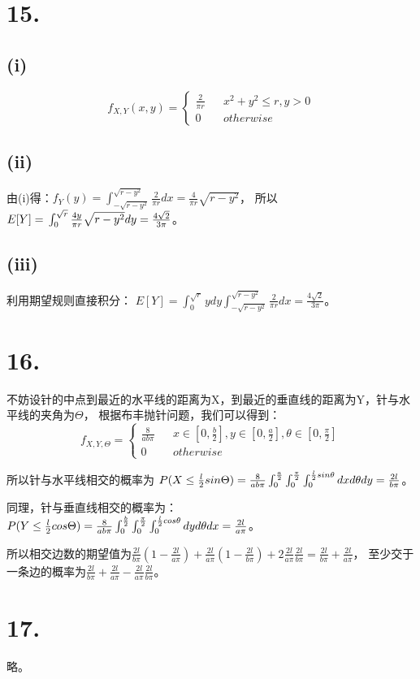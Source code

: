\documentclass[UTF8]{report}
\begin{document}
    \section*{15.}
        \subsection*{(i)}
            $$f_{X,Y}(x, y) = \left\{
                \begin{array}{lcr}
                    \frac{2}{\pi r} & & x^2 + y^2 \leq r, y > 0\\
                    0 & & otherwise
                \end{array}
            \right.$$
        \subsection*{(ii)}
            由(i)得：$f_Y(y) = \int_{-\sqrt{r - y^2}}^{\sqrt{r - y^2}}\frac{2}{\pi r}dx = \frac{4}{\pi r}\sqrt{r - y^2}$，
            所以$E[Y] =\\ \int_{0}^{\sqrt{r}}\frac{4y}{\pi r}\sqrt{r - y^2}dy = \frac{4\sqrt{2}}{3 \pi}$。
        \subsection*{(iii)}
            利用期望规则直接积分：
            $E[Y] = \int_{0}^{\sqrt{r}}ydy\int_{-\sqrt{r - y^2}}^{\sqrt{r - y^2}}\frac{2}{\pi r}dx = \frac{4\sqrt{2}}{3 \pi}$。
    \section*{16.}
        不妨设针的中点到最近的水平线的距离为X，到最近的垂直线的距离为Y，针与水平线的夹角为$\Theta$，
        根据布丰抛针问题，我们可以得到：
        $$f_{X, Y, \Theta} = \left\{
            \begin{array}{lcr}
                \frac{8}{ab\pi} & & x \in [0, \frac{b}{2}], y \in [0, \frac{a}{2}], \theta \in [0, \frac{\pi}{2}]\\
                0 & & otherwise
            \end{array}
        \right.$$

        所以针与水平线相交的概率为
        $\\P(X \leq \frac{l}{2}sin\Theta) = \frac{8}{ab\pi}\int_{0}^{\frac{a}{2}}\int_{0}^{\frac{\pi}{2}}\int_{0}^{\frac{l}{2}sin\theta}dxd\theta dy = \frac{2l}{b\pi}$。

        同理，针与垂直线相交的概率为：
        $\\P(Y \leq \frac{l}{2}cos\Theta) = \frac{8}{ab\pi}\int_{0}^{\frac{b}{2}}\int_{0}^{\frac{\pi}{2}}\int_{0}^{\frac{l}{2}cos\theta}dyd\theta dx = \frac{2l}{a\pi}$。

        所以相交边数的期望值为$\frac{2l}{b\pi}(1 - \frac{2l}{a\pi}) + \frac{2l}{a\pi}(1 - \frac{2l}{b\pi}) + 2\frac{2l}{a\pi}\frac{2l}{b\pi} = \frac{2l}{b\pi} + \frac{2l}{a\pi}$，
        至少交于一条边的概率为$\frac{2l}{b\pi} + \frac{2l}{a\pi} - \frac{2l}{a\pi}\frac{2l}{b\pi}$。

    \section*{17.}
        略。
\end{document}
